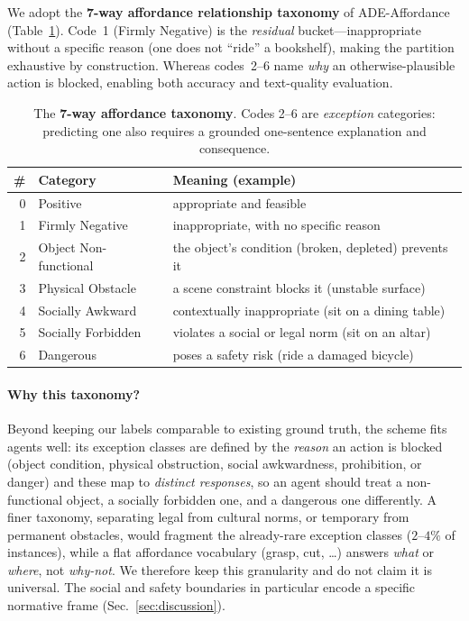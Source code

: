 \documentclass[runningheads]{llncs}
\begin{document}
We adopt the \textbf{7-way affordance relationship taxonomy} of ADE-Affordance~\cite{ade_affordance} (Table~\ref{tab:taxonomy}).
Code~1 (Firmly Negative) is the \emph{residual} bucket---inappropriate without a specific reason (one does not ``ride'' a bookshelf), making the partition exhaustive by construction.
Whereas codes~2--6 name \emph{why} an otherwise-plausible action is blocked, enabling both accuracy and text-quality evaluation.

\begin{table}[t]
  \centering
  \footnotesize
  \setlength{\tabcolsep}{5pt}
  \caption{The \textbf{7-way affordance taxonomy}. Codes 2--6 are \emph{exception} categories: predicting one also requires a grounded one-sentence explanation and consequence.}
  \label{tab:taxonomy}
  \begin{tabular}{@{}rll@{}}
    \toprule
    \# & Category & Meaning (example) \\
    \midrule
    0 & Positive              & appropriate and feasible \\
    1 & Firmly Negative       & inappropriate, with no specific reason \\
    \midrule
    2 & Object Non-functional & the object's condition (broken, depleted) prevents it \\
    3 & Physical Obstacle     & a scene constraint blocks it (unstable surface) \\
    4 & Socially Awkward      & contextually inappropriate (sit on a dining table) \\
    5 & Socially Forbidden    & violates a social or legal norm (sit on an altar) \\
    6 & Dangerous             & poses a safety risk (ride a damaged bicycle) \\
    \bottomrule
  \end{tabular}
\end{table}

\paragraph{Why this taxonomy?}
Beyond keeping our labels comparable to existing ground truth, the scheme fits agents well: its exception classes are defined by the \emph{reason} an action is blocked (object condition, physical obstruction, social awkwardness, prohibition, or danger) and these map to \emph{distinct responses}, so an agent should treat a non-functional object, a socially forbidden one, and a dangerous one differently.
A finer taxonomy, separating legal from cultural norms, or temporary from permanent obstacles, would fragment the already-rare exception classes ($2$--$4\%$ of instances), while a flat affordance vocabulary (grasp, cut, \dots) answers \emph{what} or \emph{where}, not \emph{why-not}.
We therefore keep this granularity and do not claim it is universal. 
The social and safety boundaries in particular encode a specific normative frame (Sec.~\ref{sec:discussion}).
\end{document}
